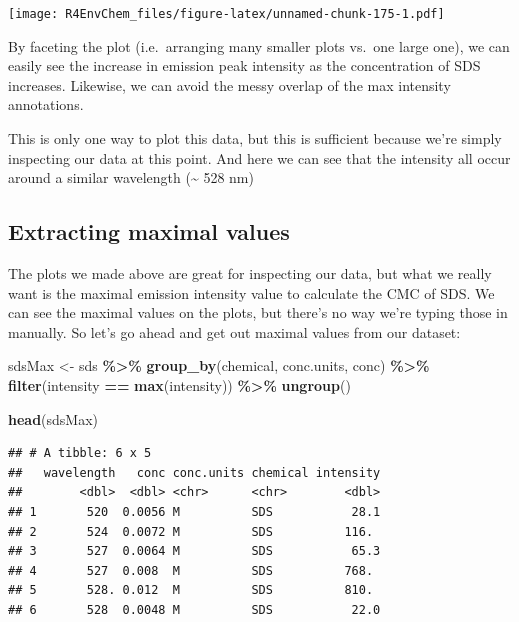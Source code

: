 \documentclass[
]{book}
\newenvironment{Shaded}{\begin{snugshade}}{\end{snugshade}}
\newcommand{\FunctionTok}[1]{\textcolor[rgb]{0.13,0.29,0.53}{\textbf{#1}}}
\newcommand{\NormalTok}[1]{#1}
\newcommand{\OtherTok}[1]{\textcolor[rgb]{0.56,0.35,0.01}{#1}}
\newcommand{\SpecialCharTok}[1]{\textcolor[rgb]{0.81,0.36,0.00}{\textbf{#1}}}
\begin{document}
\texttt{[image: R4EnvChem\_files/figure-latex/unnamed-chunk-175-1.pdf]}

By faceting the plot (i.e.~arranging many smaller plots vs.~one large one), we can easily see the increase in emission peak intensity as the concentration of SDS increases. Likewise, we can avoid the messy overlap of the max intensity annotations.

This is only one way to plot this data, but this is sufficient because we're simply inspecting our data at this point. And here we can see that the intensity all occur around a similar wavelength (\textasciitilde{} 528 nm)

\hypertarget{extracting-maximal-values}{%
\subsection{Extracting maximal values}\label{extracting-maximal-values}}

The plots we made above are great for inspecting our data, but what we really want is the maximal emission intensity value to calculate the CMC of SDS. We can see the maximal values on the plots, but there's no way we're typing those in manually. So let's go ahead and get out maximal values from our dataset:

\begin{Shaded}
\begin{Highlighting}[]
\NormalTok{sdsMax }\OtherTok{\textless{}{-}}\NormalTok{ sds }\SpecialCharTok{\%\textgreater{}\%}
  \FunctionTok{group\_by}\NormalTok{(chemical, conc.units, conc) }\SpecialCharTok{\%\textgreater{}\%}
  \FunctionTok{filter}\NormalTok{(intensity }\SpecialCharTok{==} \FunctionTok{max}\NormalTok{(intensity)) }\SpecialCharTok{\%\textgreater{}\%}
  \FunctionTok{ungroup}\NormalTok{()}

\FunctionTok{head}\NormalTok{(sdsMax)}
\end{Highlighting}
\end{Shaded}

\begin{verbatim}
## # A tibble: 6 x 5
##   wavelength   conc conc.units chemical intensity
##        <dbl>  <dbl> <chr>      <chr>        <dbl>
## 1       520  0.0056 M          SDS           28.1
## 2       524  0.0072 M          SDS          116. 
## 3       527  0.0064 M          SDS           65.3
## 4       527  0.008  M          SDS          768. 
## 5       528. 0.012  M          SDS          810. 
## 6       528  0.0048 M          SDS           22.0
\end{verbatim}
\end{document}
